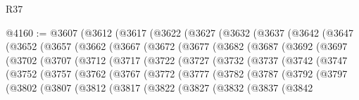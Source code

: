 \begin{lexlean}{R37}
\begin{coremodule}
@4160 := @3607
    (@3612
      (@3617
        (@3622
          (@3627
            (@3632
              (@3637
                (@3642
                  (@3647
                    (@3652
                      (@3657
                        (@3662
                          (@3667
                            (@3672
                              (@3677
                                (@3682
                                  (@3687
                                    (@3692
                                      (@3697
                                        (@3702
                                          (@3707
                                            (@3712
                                              (@3717
                                                (@3722
                                                  (@3727
                                                    (@3732
                                                      (@3737
                                                        (@3742
                                                          (@3747
                                                            (@3752
                                                              (@3757
                                                                (@3762
                                                                  (@3767
                                                                    (@3772
                                                                      (@3777
                                                                        (@3782
                                                                          (@3787
                                                                            (@3792
                                                                              (@3797
                                                                                (@3802
                                                                                  (@3807
                                                                                    (@3812
                                                                                      (@3817
                                                                                        (@3822
                                                                                          (@3827
                                                                                            (@3832
                                                                                              (@3837
                                                                                                (@3842

\end{coremodule}
\end{lexlean}
